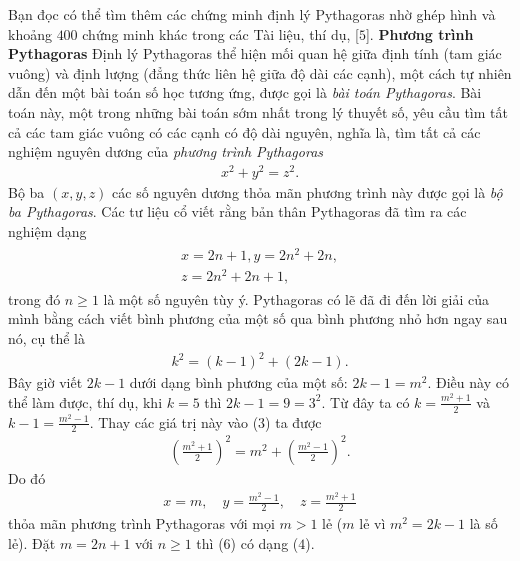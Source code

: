 \begin{multicols}{2}
\begin{figure}[H]
		\vspace*{-10pt}
	\end{figure}
	Bạn đọc có thể tìm thêm các chứng minh định lý Pythagoras nhờ ghép hình và khoảng $400$ chứng minh khác trong các Tài liệu, thí dụ, [$5$].
	\vskip 0.1cm
	\textbf{\color{lichsutoanhoc}Phương trình  Pythagoras} 
	\vskip 0.1cm
	Định lý Pythagoras thể hiện mối quan hệ giữa định tính (tam giác vuông) và định lượng (đẳng thức liên hệ giữa độ dài các cạnh), một cách tự nhiên dẫn đến một bài toán số học tương ứng, được gọi là \textit{bài toán Pythagoras}. Bài toán này, một trong những bài toán sớm nhất trong lý thuyết số, yêu cầu tìm tất cả các tam giác vuông có các cạnh có độ dài nguyên, nghĩa là, tìm tất cả các nghiệm nguyên dương của \textit{phương trình Pythagoras}
	\begin{align*}
		{x^2} + {y^2} = {z^2}. \tag{$3$}
	\end{align*}
	Bộ ba $(x,y,z)$  các số nguyên dương thỏa mãn phương trình này được gọi là \textit{bộ ba Pythagoras}.
	\vskip 0.1cm
	Các tư liệu cổ viết rằng bản thân Pythagoras đã tìm ra các nghiệm dạng
	\begin{align*}
		\begin{array}{l}
			x = 2n + 1, y = 2{n^2} + 2n, \\
			z = 2{n^2} + 2n + 1,
		\end{array}\tag{$4$}
	\end{align*}
	trong đó $n \ge 1$  là một số nguyên tùy ý.
	\vskip 0.1cm
	Pythagoras có lẽ đã đi đến lời giải của mình bằng cách viết bình phương của một số qua bình phương nhỏ hơn ngay sau nó, cụ thể là
	\begin{align*}
		{k^2} = {(k - 1)^2} + (2k - 1). \tag{$5$}
	\end{align*}
	Bây giờ viết $2k-1$ dưới dạng bình phương của một số: $2k - 1 = {m^2}$.  Điều này có thể làm được, thí dụ, khi $k=5$  thì $2k-1= 9= 3^2$. Từ đây ta có $k = \frac{{{m^2} + 1}}{2}$  và   $k - 1 = \frac{{{m^2} - 1}}{2}$.
	\vskip 0.1cm
	Thay các giá trị này vào ($3$) ta được
	\begin{align*}
		{\left( {\frac{{{m^2} + 1}}{2}} \right)^2} = {m^2} + {\left( {\frac{{{m^2} - 1}}{2}} \right)^2}.
	\end{align*}
	Do đó
	\begin{align*}
		x = m,\quad y = \frac{{{m^2} - 1}}{2},\quad z = \frac{{{m^2} + 1}}{2} \tag{$6$}
	\end{align*}
	thỏa mãn phương trình Pythagoras với mọi $m>1$ lẻ ($m$  lẻ vì $m^2 = 2k-1$  là số lẻ). Đặt $m = 2n +1$  với $n \ge 1$  thì ($6$) có dạng ($4$).

\end{multicols}

